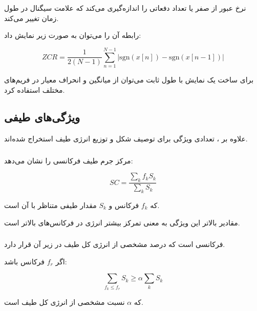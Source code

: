 نرخ عبور از صفر یا
تعداد دفعاتی را اندازه‌گیری می‌کند که علامت سیگنال در طول زمان تغییر می‌کند.

رابطه آن را می‌توان به صورت زیر نمایش داد:

\begin{equation}
ZCR
=
\frac{1}{2(N-1)}
\sum_{n=1}^{N-1}
\left|
\mathrm{sgn}(x[n])
-
\mathrm{sgn}(x[n-1])
\right|
\end{equation}

برای ساخت یک نمایش با طول ثابت می‌توان از میانگین و انحراف معیار
در فریم‌های مختلف استفاده کرد.


\subsection{ویژگی‌های طیفی}

علاوه بر
،
تعدادی ویژگی برای توصیف شکل و توزیع انرژی طیف استخراج شده‌اند.


\subsubsection{}

مرکز جرم طیف فرکانسی را نشان می‌دهد:

\begin{equation}
SC
=
\frac{
\sum_k f_k S_k
}{
\sum_k S_k
}
\end{equation}

که $f_k$ فرکانس و $S_k$ مقدار طیفی متناظر با آن است.

مقادیر بالاتر این ویژگی به معنی تمرکز بیشتر انرژی در فرکانس‌های بالاتر است.


\subsubsection{}

فرکانسی است که درصد مشخصی از انرژی کل طیف در زیر آن قرار دارد.

اگر $f_r$ فرکانس
باشد:

\begin{equation}
\sum_{f_k\leq f_r}S_k
\geq
\alpha
\sum_k S_k
\end{equation}

که $\alpha$ نسبت مشخصی از انرژی کل طیف است.


\subsubsection{}

